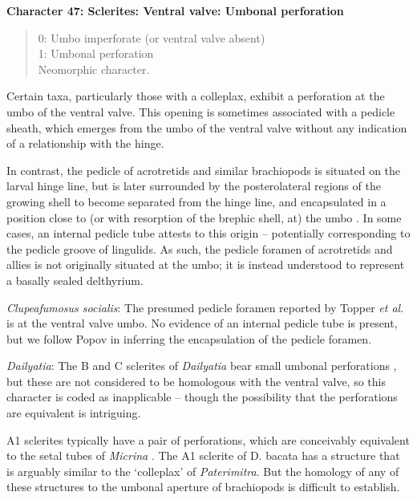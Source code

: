 \documentclass[openany]{book}
\theoremstyle{definition}
\theoremstyle{definition}
\theoremstyle{definition}
\theoremstyle{remark}
\begin{document}
\textbf{Character 47: Sclerites: Ventral valve: Umbonal perforation}

\begin{quote}
0: Umbo imperforate (or ventral valve absent)\\
1: Umbonal perforation\\
Neomorphic character.
\end{quote}

Certain taxa, particularly those with a colleplax, exhibit a perforation
at the umbo of the ventral valve. This opening is sometimes associated
with a pedicle sheath, which emerges from the umbo of the ventral valve
without any indication of a relationship with the hinge.

In contrast, the pedicle of acrotretids and similar brachiopods is
situated on the larval hinge line, but is later surrounded by the
posterolateral regions of the growing shell to become separated from the
hinge line, and encapsulated in a position close to (or with resorption
of the brephic shell, at) the umbo \citep[see][pp.~407--411 and fig. 3
for discussion]{Popov1992TheCambrian}. In some cases, an internal
pedicle tube attests to this origin -- potentially corresponding to the
pedicle groove of lingulids. As such, the pedicle foramen of acrotretids
and allies is not originally situated at the umbo; it is instead
understood to represent a basally sealed delthyrium.

\hypertarget{Clupeafumosus_socialis-coding-47}{}
\emph{Clupeafumosus socialis}: The presumed pedicle foramen reported by
Topper \emph{et al}. \citeyearpar{Topper2013Reappraisalof} is at the
ventral valve umbo. No evidence of an internal pedicle tube is present,
but we follow Popov \citeyearpar{Popov1992TheCambrian} in inferring the
encapsulation of the pedicle foramen.

\hypertarget{Dailyatia-coding-47}{}
\emph{Dailyatia}: The B and C sclerites of \emph{Dailyatia} bear small
umbonal perforations \citep{Skovsted2015Theearly}, but these are not
considered to be homologous with the ventral valve, so this character is
coded as inapplicable -- though the possibility that the perforations
are equivalent is intriguing.

A1 sclerites typically have a pair of perforations, which are
conceivably equivalent to the setal tubes of \emph{Micrina}
\citep{Holmer2011Firstrecord}. The A1 sclerite of D. bacata has a
structure that is arguably similar to the `colleplax' of
\emph{Paterimitra}. But the homology of any of these structures to the
umbonal aperture of brachiopods is difficult to establish.
\end{document}
